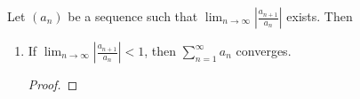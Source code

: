 \documentclass[../main.tex]{subfiles}
\begin{document}
\begin{theorem}\label{trm:16.15}
    Let $(a_n)$ be a sequence such that $\lim_{n\to\infty}|\frac{a_{n+1}}{a_n}|$ exists. Then
    \begin{enumerate}[label={\textup{(}\alph*\textup{)}},ref={\thetheorem\alph*}]
        \item \label{trm:16.15a}If $\lim_{n\to\infty}|\frac{a_{n+1}}{a_n}|<1$, then $\sum_{n=1}^\infty a_n$ converges.
        \begin{proof}

\end{proof}
\end{enumerate}
\end{theorem}
\end{document}
